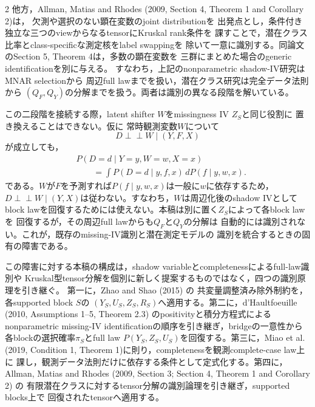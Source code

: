 \documentclass[a4paper,10pt]{article}
\newcommand{\indep}{\mathrel{\perp\!\!\!\perp}}
\begin{document}
\begin{multicols}{2}
他方，Allman, Matias and Rhodes (2009, Section 4, Theorem 1 and Corollary 2)は，
欠測や選択のない顕在変数のjoint distributionを
出発点とし，条件付き独立な三つのviewからなるtensorにKruskal rank条件を
課すことで，潜在クラス比率とclass-specificな測定核をlabel swappingを
除いて一意に識別する。同論文のSection 5, Theorem 4は，多数の顕在変数を
三群にまとめた場合のgeneric identificationを別に与える。
すなわち，上記のnonparametric shadow-IV研究はMNAR selectionから
周辺full lawまでを扱い，潜在クラス研究は完全データ法則から
$(Q_F,Q_Y)$の分解までを扱う。両者は識別の異なる段階を解いている。

この二段階を接続する際，latent shifter $W$をmissingness IV $Z_S$と同じ役割に
置き換えることはできない。仮に
常時観測変数$W$について
\begin{equation}
D\indep W\mid(Y,F,X)
\label{eq:latent-shifter-exclusion}
\end{equation}
が成立しても，
\begin{equation}
\begin{aligned}
&P(D=d\mid Y=y,W=w,X=x)\\
&\qquad=
\int P(D=d\mid y,f,x)\,dP(f\mid y,w,x).
\end{aligned}
\label{eq:latent-shifter-marginal-selection}
\end{equation}
である。$W$が$F$を予測すれば$P(f\mid y,w,x)$は一般に$w$に依存するため，
$D\indep W\mid(Y,X)$は従わない。すなわち，$W$は周辺化後のshadow IVとして
block lawを回復するためには使えない。本稿は別に置く$Z_S$によって各block lawを
回復するが，その周辺full lawからも$Q_F$と$Q_Y$の分解は
自動的には識別されない。これが，既存のmissing-IV識別と潜在測定モデルの
識別を統合するときの固有の障害である。

この障害に対する本稿の構成は，shadow variableとcompletenessによるfull-law識別や
Kruskal型tensor分解を個別に新しく提案するものではなく，四つの識別原理を引き継ぐ。
第一に，Zhao and Shao (2015) の
共変量調整済み除外制約を，各supported block $S$の
$(Y_S,U_S,Z_S,R_S)$へ適用する。第二に，d'Haultfoeuille
(2010, Assumptions 1--5, Theorem 2.3) のpositivityと積分方程式による
nonparametric missing-IV identificationの順序を引き継ぎ，bridgeの一意性から
各blockの選択確率$\pi_S$とfull law $P(Y_S,Z_S,U_S)$を回復する。第三に，Miao et al.
(2019, Condition 1, Theorem 1)に則り，completenessを観測complete-case law上に
課し，観測データ法則だけに依存する条件として定式化する。第四に，Allman,
Matias and Rhodes (2009, Section 3; Section 4, Theorem 1 and Corollary 2) の
有限潜在クラスに対するtensor分解の識別論理を引き継ぎ，supported blocks上で
回復されたtensorへ適用する。


\end{multicols}
\end{document}
